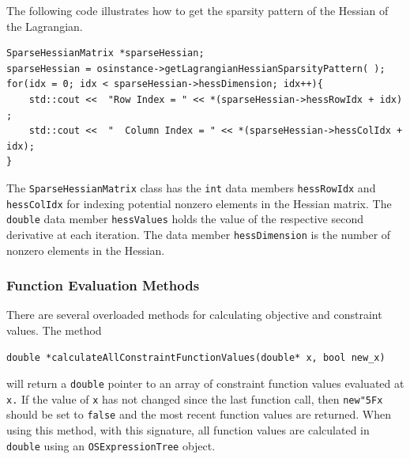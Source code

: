 \documentclass[11pt]{article}
\renewcommand{\_}{{\char"5F}}
\renewcommand{\{}{{\char"7B}}
\renewcommand{\}}{{\char"7D}}
\renewcommand{\^}{{\char"0D}}
\renewcommand{\'}{{\char"0D}}
\begin{document}
\begin{enumerate}[Step 1:]
The following code illustrates how to get the sparsity pattern of the Hessian of the Lagrangian.
\begin{verbatim}
SparseHessianMatrix *sparseHessian;
sparseHessian = osinstance->getLagrangianHessianSparsityPattern( );
for(idx = 0; idx < sparseHessian->hessDimension; idx++){
    std::cout <<  "Row Index = " << *(sparseHessian->hessRowIdx + idx) ;
    std::cout <<  "  Column Index = " << *(sparseHessian->hessColIdx + idx);
}
\end{verbatim}
The {\tt SparseHessianMatrix} class has the {\tt int} data members {\tt hessRowIdx} and {\tt hessColIdx} for indexing  potential nonzero elements in the Hessian matrix. The {\tt double} data member {\tt hessValues} holds the value of the respective second derivative at each iteration.   The data member {\tt hessDimension} is the number of nonzero elements in the Hessian.


\subsubsection{Function Evaluation Methods}

There are several overloaded methods for calculating objective and constraint values.  The method
\begin{verbatim}
double *calculateAllConstraintFunctionValues(double* x, bool new_x)
\end{verbatim}
will return a {\tt double} pointer to an array of constraint function values evaluated at {\tt x.}  If the value of {\tt x} has not changed since the last function call, then {\tt new\_x} should be set to {\tt false} and the most recent function values are returned.  When using this method, with this signature,  all function values are calculated in {\tt double} using an {\tt OSExpressionTree} object.


\end{enumerate}
\end{document}
